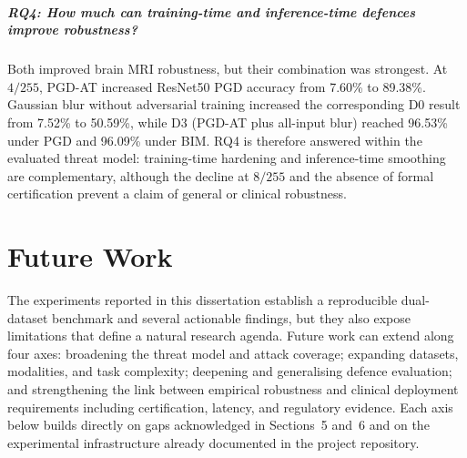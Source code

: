 \documentclass[12pt,a4paper,oneside]{report}
\begin{document}
\paragraph{RQ4: How much can training-time and inference-time defences improve robustness?}
Both improved brain MRI robustness, but their combination was strongest. At $4/255$, PGD-AT increased ResNet50 PGD accuracy from 7.60\% to 89.38\%. Gaussian blur without adversarial training increased the corresponding D0 result from 7.52\% to 50.59\%, while D3 (PGD-AT plus all-input blur) reached 96.53\% under PGD and 96.09\% under BIM. RQ4 is therefore answered within the evaluated threat model: training-time hardening and inference-time smoothing are complementary, although the decline at $8/255$ and the absence of formal certification prevent a claim of general or clinical robustness.

\chapter{Future Work}
\label{ch:future}


The experiments reported in this dissertation establish a reproducible dual-dataset benchmark and several actionable findings, but they also expose limitations that define a natural research agenda. Future work can extend along four axes: broadening the threat model and attack coverage; expanding datasets, modalities, and task complexity; deepening and generalising defence evaluation; and strengthening the link between empirical robustness and clinical deployment requirements including certification, latency, and regulatory evidence. Each axis below builds directly on gaps acknowledged in Sections~5 and~6 and on the experimental infrastructure already documented in the project repository.
\end{document}
